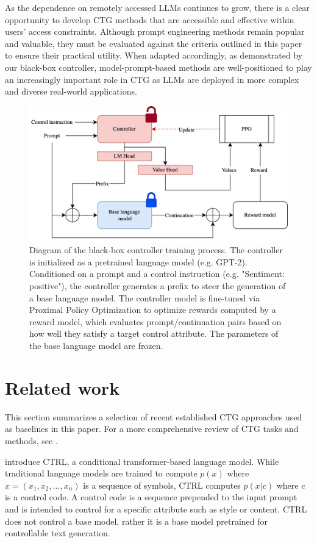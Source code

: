 \documentclass[phd,electronic,oneside,twosidetoc,letterpaper,chaptercenter,parttop,lof]{byumsphd}
\begin{document}
As the dependence on remotely accessed LLMs continues to grow, there is a clear opportunity to develop CTG methods that are accessible and effective within users' access constraints.
Although prompt engineering methods remain popular and valuable, they must be evaluated against the criteria outlined in this paper to ensure their practical utility.
When adapted accordingly, as demonstrated by our black-box controller, model-prompt-based methods are well-positioned to play an increasingly important role in CTG as LLMs are deployed in more complex and diverse real-world applications.


\begin{figure}[t!]
    \centering
    \includegraphics[width=0.75\linewidth]{images/bbc/system_diagram_value_head.png}
    \caption[System diagram with value head]{Diagram of the black-box controller training process. The controller is initialized as a pretrained language model (e.g. GPT-2). Conditioned on a prompt and a control instruction (e.g. "Sentiment: positive"), the controller generates a prefix to steer the generation of a base language model. The controller model is fine-tuned via Proximal Policy Optimization to optimize rewards computed by a reward model, which evaluates prompt/continuation pairs based on how well they satisfy a target control attribute. The parameters of the base language model are frozen.}
    \label{fig:system_diagram}\vspace{12pt}
\end{figure}

\section{Related work}
\label{related_work}

This section summarizes a selection of recent established CTG approaches used as baselines in this paper.
For a more comprehensive review of CTG tasks and methods, see \citep{zhang2023survey}.

\citet{keskar2019ctrl} introduce CTRL, a conditional transformer-based language model.
While traditional language models are trained to compute \(p(x)\) where \(x = (x_1, x_2, \ldots, x_n)\) is a sequence of symbols, CTRL  computes \(p(x | c)\) where \(c\) is a control code.
A control code is a sequence prepended to the input prompt and is intended to control for a specific attribute such as style or content.
CTRL does not control a base model, rather it is a base model pretrained for controllable text generation.
\end{document}
